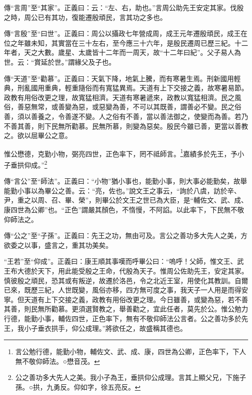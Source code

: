 {\noindent\zhuan{}\fzbyks 傳“言周”至“其家”。正義曰：云：“左、右，助也。”言周公助先王安定其家。伐殷之時，周公已有其功，復能遷殷頑民，言其功之多也。 \par}

{\noindent\zhuan{}\fzbyks 傳“言殷”至“曰世”。正義曰：周公以攝政七年營成周，成王元年遷殷頑民，成王在位之年雖未知，其實當在三十左右，至今應三十六年，是殷民遷周已歷三紀。十二年者，天之大數。歲星、太歲皆十二年而一周天，故“十二年曰紀”。父子易人為世。云：“賞延於世。”謂緣父及子也。 \par}

{\noindent\zhuan{}\fzbyks 傳“天道”至“勸慕”。正義曰：天氣下降，地氣上騰，而有寒暑生焉。刑新國用輕典，刑亂國用重典，輕重隨俗而有寬猛異焉。天道有上下交接之義，故寒暑易節。政教有用俗改更之理，故寬猛相濟。天道有寒暑遞來，政教以寬猛相濟。民之風俗，善惡無常，或善變為惡，或惡變為善，不可以其既善，謂善必不變。民之俗善，須以善養之，令善遂不變。人之俗有不善，當以善法御之，使變而為善。若乃不善其善，則下民無所勸慕。民無所慕，則變為惡矣。殷民今雖已善，更當以善教之。欲以屈畢公之意。 \par}

惟公懋德，克勤小物，弼亮四世，正色率下，罔不祗師言。\footnote{言公勉行德，能勤小物，輔佐文、武、成、康，四世為公卿，正色率下，下人無不敬仰師法。○懋音茂。}嘉績多於先王，予小子垂拱仰成。”\footnote{公之善功多大先人之美。我小子為王，垂拱仰公成理。言其上顯父兄，下施子孫。○拱，九勇反。仰如字，徐五亮反。}

{\noindent\zhuan{}\fzbyks 傳“言公”至“師法”。正義曰：“小物”猶小事也，能勤小事，則大事必能勤矣，故舉能勤小事以為畢公之善。云：“亮，佐也。”說文王之事云，“詢於八虞，訪於辛、尹，重之以周、召、畢、榮”，則畢公於文王之世已為大臣，是“輔佐文、武、成、康四世為公卿”也。“正色”謂嚴其顏色，不惰慢，不阿諂。以此率下，下民無不敬仰師法之。 \par}

{\noindent\zhuan{}\fzbyks 傳“公之”至“子孫”。正義曰：先王之功，無由可及。言公之善功多大先人之美，方欲委之以事，盛言之，重其功美矣。 \par}

{\noindent\shu{}\fzkt “王若”至“仰成”。正義曰：康王順其事嘆而呼畢公曰：“嗚呼！父師，惟文王、武王布大德於天下，用此能受殷之王命，代殷為天子。惟周公佐助先王，安定其家。慎彼殷之頑民，恐其或有叛逆，故遷於洛邑，令之北近王室，用使化其教訓。自爾已來，既歷三紀，人世既變，風俗亦移，四方無可度之事，我天子一人用是而得安寧。但天道有上下交接之義，政教有用俗改更之理。今日雖善，或變為惡，若不善其善，則民無所勸慕。更須選賢教之，舉善勸之，宜此任者，莫先於公。惟公勉力行德，能勤小事，輔佐四世，正色率下，無有不敬仰師法公言者。公之善功多於先王，我小子垂衣拱手，仰公成理。”將欲任之，故盛稱其德也。 \par}

